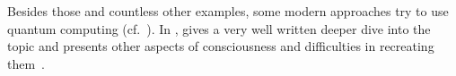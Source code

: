 Besides those and countless other examples, some modern approaches try to use quantum computing (cf.~\cite{saxena2013}).
In , \citeauthor{Meissner2020} gives a very well written deeper dive into the topic and presents other aspects of consciousness and difficulties in recreating them~\cite{Meissner2020}.
